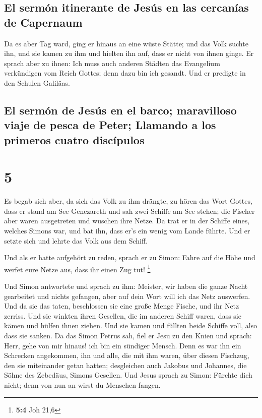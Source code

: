 \hypertarget{el-sermuxf3n-itinerante-de-jesuxfas-en-las-cercanuxedas-de-capernaum}{%
\subsection{El sermón itinerante de Jesús en las cercanías de
Capernaum}\label{el-sermuxf3n-itinerante-de-jesuxfas-en-las-cercanuxedas-de-capernaum}}

 Da es aber Tag ward, ging er hinaus an eine wüste
Stätte; und das Volk suchte ihn, und sie kamen zu ihm und hielten ihn
auf, dass er nicht von ihnen ginge.  Er sprach aber zu
ihnen: Ich muss auch anderen Städten das Evangelium verkündigen vom
Reich Gottes; denn dazu bin ich gesandt.  Und er predigte
in den Schulen Galiläas.

\hypertarget{el-sermuxf3n-de-jesuxfas-en-el-barco-maravilloso-viaje-de-pesca-de-peter-llamando-a-los-primeros-cuatro-discuxedpulos}{%
\subsection{El sermón de Jesús en el barco; maravilloso viaje de pesca
de Peter; Llamando a los primeros cuatro
discípulos}\label{el-sermuxf3n-de-jesuxfas-en-el-barco-maravilloso-viaje-de-pesca-de-peter-llamando-a-los-primeros-cuatro-discuxedpulos}}

\hypertarget{section-4}{%
\section{5}\label{section-4}}

 Es begab sich aber, da sich das Volk zu ihm drängte, zu
hören das Wort Gottes, dass er stand am See Genezareth 
und sah zwei Schiffe am See stehen; die Fischer aber waren ausgetreten
und wuschen ihre Netze.  Da trat er in der Schiffe eines,
welches Simons war, und bat ihn, dass er's ein wenig vom Lande führte.
Und er setzte sich und lehrte das Volk aus dem Schiff.

 Und als er hatte aufgehört zu reden, sprach er zu Simon:
Fahre auf die Höhe und werfet eure Netze aus, dass ihr einen Zug tut!
\footnote{\textbf{5:4} Joh 21,6}

 Und Simon antwortete und sprach zu ihm: Meister, wir
haben die ganze Nacht gearbeitet und nichts gefangen, aber auf dein Wort
will ich das Netz auswerfen.  Und da sie das taten,
beschlossen sie eine große Menge Fische, und ihr Netz zerriss.
 Und sie winkten ihren Gesellen, die im anderen Schiff
waren, dass sie kämen und hülfen ihnen ziehen. Und sie kamen und füllten
beide Schiffe voll, also dass sie sanken.  Da das Simon
Petrus sah, fiel er Jesu zu den Knien und sprach: Herr, gehe von mir
hinaus! ich bin ein sündiger Mensch.  Denn es war ihn ein
Schrecken angekommen, ihn und alle, die mit ihm waren, über diesen
Fischzug, den sie miteinander getan hatten;  desgleichen
auch Jakobus und Johannes, die Söhne des Zebedäus, Simons Gesellen. Und
Jesus sprach zu Simon: Fürchte dich nicht; denn von nun an wirst du
Menschen fangen.

